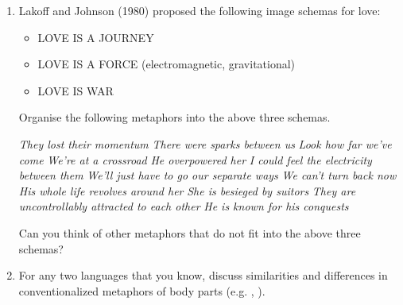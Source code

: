 \documentclass[a4paper]{article}
\begin{document}
\begin{enumerate}
\item Lakoff and Johnson (1980) proposed the following image schemas for love:
  \begin{itemize}
  \item LOVE IS A JOURNEY
  \item LOVE IS A FORCE (electromagnetic, gravitational)
  \item LOVE IS WAR
  \end{itemize}
Organise the following metaphors into the above three schemas.
\begin{exe}
  \ex \textit{They lost their momentum}
 \ex \textit{There were sparks between us}
  \ex \textit{Look how far we've come}
\ex \textit{We're at a crossroad}
  \ex \textit{He overpowered her}
\ex \textit{I could feel the electricity between them}
\ex \textit{We'll just have to go our separate ways}
\ex \textit{We can't turn back now}
\ex \textit{His whole life revolves around her}
\ex \textit{She is besieged by suitors}
\ex \textit{They are uncontrollably attracted to each other}
\ex \textit{He is known for his conquests}
\end{exe}
Can you think of other metaphors that do not fit into the above three schemas?

\item For any two languages that you know, discuss similarities and
  differences in conventionalized metaphors of body parts
  (e.g. , ).
 
\end{enumerate}
\end{document}
